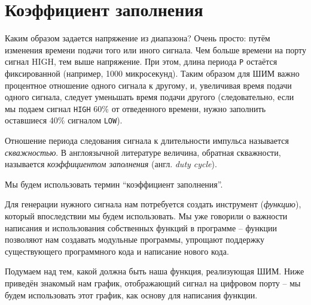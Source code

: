 \documentclass[../sparc.tex]{subfiles}
\begin{document}
\section{Коэффициент заполнения}

Каким образом задается напряжение из диапазона? Очень просто: путём изменения
времени подачи того или иного сигнала. Чем больше времени на порту сигнал HIGH,
тем выше напряжение. При этом, длина периода \texttt{P} остаётся фиксированной
(например, 1000 микросекунд). Таким образом для \gls{ШИМ} важно процентное
отношение одного сигнала к другому, и, увеличивая время подачи одного сигнала,
следует уменьшать время подачи другого (следовательно, если мы подаем сигнал
\texttt{HIGH} 60\% от отведенного времени, нужно заполнить оставшиеся 40\%
сигналом \texttt{LOW}).

Отношение периода следования сигнала к длительности импульса называется
\emph{скважностью}. В англоязычной литературе величина, обратная скважности,
называется \emph{коэффициентом заполнения} (англ. \emph{duty cycle}).

Мы будем использовать термин ``коэффициент заполнения''.


Для генерации нужного сигнала нам потребуется создать инструмент
(\emph{функцию}), который впоследствии мы будем использовать. Мы уже говорили о
важности написания и использования собственных функций в программе -- функции
позволяют нам создавать модульные программы, упрощают поддержку существующего
программного кода и написание нового кода.

Подумаем над тем, какой должна быть наша функция, реализующая ШИМ. Ниже приведён
знакомый нам график, отображающий сигнал на цифровом порту -- мы будем
использовать этот график, как основу для написания функции.
\end{document}
